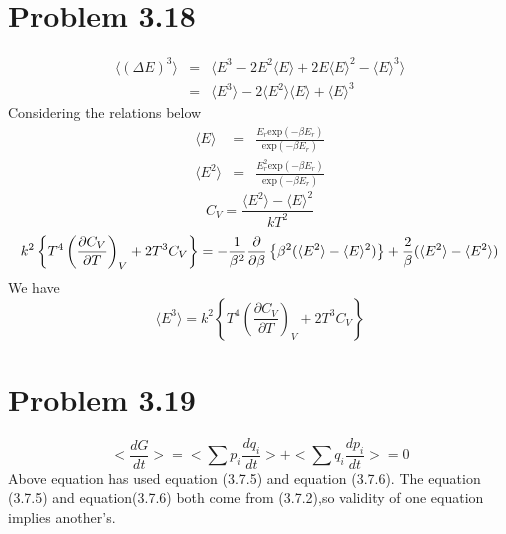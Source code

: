 \documentclass{article}
\begin{document}
\section*{Problem 3.18}
\begin{eqnarray*}
\langle(\Delta E)^3\rangle&=&\langle E^3-2E^2\langle E\rangle +2E\langle E\rangle ^2-\langle E\rangle ^3\rangle \\&=&\langle E^3\rangle -2\langle E^2\rangle \langle E\rangle +\langle E\rangle^3
\end{eqnarray*}
Considering the relations below
\begin{eqnarray*}
\langle E\rangle &=&\frac{E_r\mathrm{exp}(-\beta E_r)}{\mathrm{exp}(-\beta E_r)}\\
\langle E^2\rangle &=&\frac{E_r^2\mathrm{exp}(-\beta E_r)}{\mathrm{exp}(-\beta E_r)}
\end{eqnarray*}
\begin{equation*}
C_V=\frac{\langle E^2\rangle-\langle E\rangle^2}{kT^2}
\end{equation*}
\begin{equation*}
k^2\left\{T^4\left(\frac{\partial C_V}{\partial T}\right)_V+2T^3C_V\right\}=-\frac{1}{\beta^2}\frac{\partial}{\partial \beta}\left\{\beta^2(\langle E^2\rangle-\langle E\rangle^2)\right\}+\frac{2}{\beta}(\langle E^2\rangle-\langle E^2\rangle)\\
\end{equation*}
We have
\begin{equation*}
\langle E^3\rangle=k^2\left\{T^4\left(\frac{\partial C_V}{\partial T}\right)_V+2T^3C_V\right\}
\end{equation*}

\section*{Problem 3.19}
	\begin{equation*}
		<\frac{dG}{dt}>=<\sum p_i \frac{dq_i}{dt}>+<\sum q_i \frac{dp_i}{dt}>=0
	\end{equation*}
	Above equation has used equation (3.7.5) and equation (3.7.6).
	The equation (3.7.5) and equation(3.7.6)  both come from (3.7.2),so validity of one equation implies another's.
	
\end{document}
